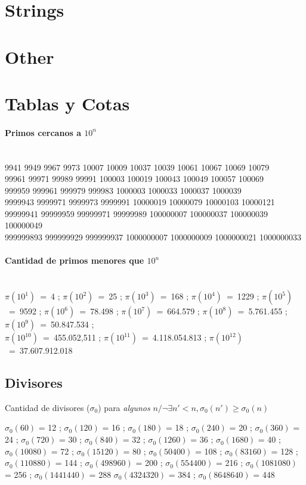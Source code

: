 \documentclass{article}
\begin{document}
\begin{multicols*}{2}
\section{Strings}
\section{Other}

\section{Tablas y Cotas}
\paragraph{Primos cercanos a $10^n$}\ \\
9941 9949 9967 9973 10007 10009 10037 10039 10061 10067 10069 10079\\
99961 99971 99989 99991 100003 100019 100043 100049 100057 100069\\
999959 999961 999979 999983 1000003 1000033 1000037 1000039\\
9999943 9999971 9999973 9999991 10000019 10000079 10000103 10000121\\
99999941 99999959 99999971 99999989 100000007 100000037 100000039 100000049\\
999999893 999999929 999999937 1000000007 1000000009 1000000021 1000000033

\paragraph{Cantidad de primos menores que $10^n$}\ \\
$\pi(10^1)$~=~4 ;
$\pi(10^2)$~=~25 ;
$\pi(10^3)$~=~168 ;
$\pi(10^4)$~=~1229 ;
$\pi(10^5)$~=~9592 ;
$\pi(10^6)$~=~78.498 ;
$\pi(10^7)$~=~664.579 ;
$\pi(10^8)$~=~5.761.455 ;
$\pi(10^9)$~=~50.847.534 ;\\
$\pi(10^{10})$~=~455.052,511 ;
$\pi(10^{11})$~=~4.118.054.813 ;
$\pi(10^{12})$~=~37.607.912.018
%
%
%
\subsection{Divisores}
Cantidad de divisores ($\sigma_0$) para \emph{algunos} $n / \neg\exists n'<n, \sigma_0(n') \geqslant \sigma_0(n)$

$\sigma_0(60)$ = 12 ; $\sigma_0(120)$ = 16 ; $\sigma_0(180)$ = 18 ; $\sigma_0(240)$ = 20 ; $\sigma_0(360)$ = 24 ;
$\sigma_0(720)$ = 30 ; $\sigma_0(840)$ = 32 ; $\sigma_0(1260)$ = 36 ; $\sigma_0(1680)$ = 40 ; $\sigma_0(10080)$ = 72 ; $\sigma_0(15120)$ = 80 ; $\sigma_0(50400)$ = 108 ; $\sigma_0(83160)$ = 128 ; $\sigma_0(110880)$ = 144 ;
$\sigma_0(498960)$ = 200 ; $\sigma_0(554400)$ = 216 ; $\sigma_0(1081080)$ = 256 ; $\sigma_0(1441440)$ = 288  $\sigma_0(4324320)$ = 384 ; $\sigma_0(8648640)$ = 448


\end{multicols*}
\end{document}
